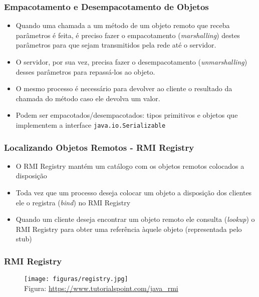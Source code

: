 \documentclass[Ligatures=TeX,table,brazil,svgnames,usetotalslideindicator,comp
ress,10pt]{beamer}
\begin{document}
\begin{frame}
  \frametitle{Empacotamento e Desempacotamento de Objetos}
  \begin{itemize}
  \item Quando uma chamada a um método de um objeto remoto que receba
    parâmetros é feita, é preciso fazer o \alert{empacotamento}
    (\emph{marshalling}) destes parâmetros para que sejam transmitidos
    pela rede até o servidor.
  \item O servidor, por sua vez, precisa fazer o
    \alert{desempacotamento} (\emph{unmarshalling}) desses parâmetros
    para repassá-los ao objeto.
  \item O mesmo processo é necessário para devolver ao cliente o
    resultado da chamada do método caso ele devolva um valor.
  \item Podem ser empacotados/desempacotados: tipos primitivos e
    objetos que implementem a interface \texttt{java.io.Serializable}
  \end{itemize}
\end{frame}

\begin{frame}
  \frametitle{Localizando Objetos Remotos - RMI Registry}
  \begin{itemize}
  \item O \alert{RMI Registry} mantém um catálogo com os
    objetos remotos colocados a disposição
  \item Toda vez que um processo deseja colocar um objeto a disposição
    dos clientes ele o \alert{registra} (\emph{bind}) no RMI Registry
  \item Quando um cliente deseja encontrar um objeto remoto ele
    \alert{consulta} (\emph{lookup}) o RMI Registry para obter uma
    referência àquele objeto (representada pelo stub)
  \end{itemize}
\end{frame}

\begin{frame}
  \frametitle{RMI Registry}
  \begin{figure}[ht]
    \centering
    \texttt{[image: figuras/registry.jpg]}
    \\\tiny{Figura: \url{https://www.tutorialspoint.com/java_rmi}}
  \end{figure}
\end{frame}
\end{document}
